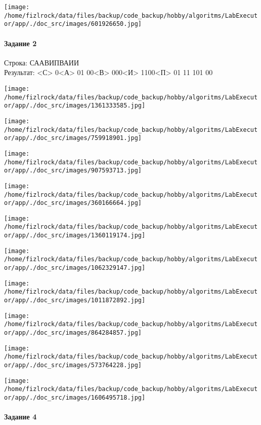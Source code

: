 \documentclass[a4paper, 12pt]{article}
\begin{document}
\texttt{[image: /home/fizlrock/data/files/backup/code\_backup/hobby/algoritms/LabExecutor/app/./doc\_src/images/601926650.jpg]}
\pagebreak
\paragraph{Задание 2}

Строка: 
СААВИПВАИИ\\
Результат: <С> 0<А> 01 00<В> 000<И> 1100<П> 01 11 101 00

\texttt{[image: /home/fizlrock/data/files/backup/code\_backup/hobby/algoritms/LabExecutor/app/./doc\_src/images/1361333585.jpg]}

\texttt{[image: /home/fizlrock/data/files/backup/code\_backup/hobby/algoritms/LabExecutor/app/./doc\_src/images/759918901.jpg]}

\texttt{[image: /home/fizlrock/data/files/backup/code\_backup/hobby/algoritms/LabExecutor/app/./doc\_src/images/907593713.jpg]}

\texttt{[image: /home/fizlrock/data/files/backup/code\_backup/hobby/algoritms/LabExecutor/app/./doc\_src/images/360166664.jpg]}

\texttt{[image: /home/fizlrock/data/files/backup/code\_backup/hobby/algoritms/LabExecutor/app/./doc\_src/images/1360119174.jpg]}

\texttt{[image: /home/fizlrock/data/files/backup/code\_backup/hobby/algoritms/LabExecutor/app/./doc\_src/images/1062329147.jpg]}

\texttt{[image: /home/fizlrock/data/files/backup/code\_backup/hobby/algoritms/LabExecutor/app/./doc\_src/images/1011872892.jpg]}

\texttt{[image: /home/fizlrock/data/files/backup/code\_backup/hobby/algoritms/LabExecutor/app/./doc\_src/images/864284857.jpg]}

\texttt{[image: /home/fizlrock/data/files/backup/code\_backup/hobby/algoritms/LabExecutor/app/./doc\_src/images/573764228.jpg]}

\texttt{[image: /home/fizlrock/data/files/backup/code\_backup/hobby/algoritms/LabExecutor/app/./doc\_src/images/1606495718.jpg]}
\pagebreak
\paragraph{Задание 4}
\end{document}
